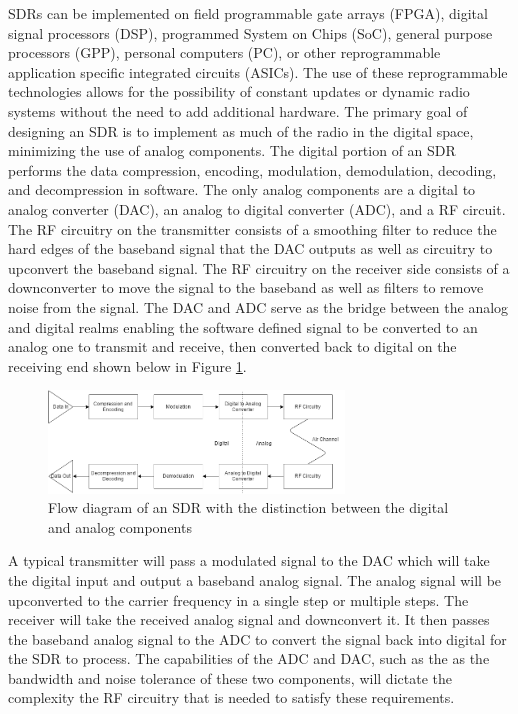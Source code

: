 SDRs can be implemented on field programmable gate arrays (FPGA), digital signal processors (DSP), programmed System on Chips (SoC), general purpose processors (GPP), personal computers (PC), or other reprogrammable application specific integrated circuits (ASICs). The use of these reprogrammable technologies allows for the possibility of constant updates or dynamic radio systems without the need to add additional hardware. The primary goal of designing an SDR is to implement as much of the radio in the digital space, minimizing the use of analog components. The digital portion of an SDR performs the data compression, encoding, modulation, demodulation, decoding, and decompression in software. The only analog components are a digital to analog converter (DAC), an analog to digital converter (ADC), and a RF circuit. The RF circuitry on the transmitter consists of a smoothing filter to reduce the hard edges of the baseband signal that the DAC outputs as well as circuitry to upconvert the baseband signal. The RF circuitry on the receiver side consists of a downconverter to move the signal to the baseband as well as filters to remove noise from the signal. The DAC and ADC serve as the bridge between the analog and digital realms enabling the software defined signal to be converted to an analog one to transmit and receive, then converted back to digital on the receiving end shown below in Figure \ref{fig:sdr_flow_diagram}.
\begin{figure}[ht]
\centering
\includegraphics[width=0.70\textwidth]{img/sdr_diagram.png}
\caption{Flow diagram of an SDR with the distinction between the digital and analog components}
\label{fig:sdr_flow_diagram}
\end{figure}\par
A typical transmitter will pass a modulated signal to the DAC which will take the digital input and output a baseband analog signal. The analog signal will be upconverted to the carrier frequency in a single step or multiple steps. The receiver will take the received analog signal and downconvert it. It then passes the baseband analog signal to the ADC to convert the signal back into digital for the SDR to process. The capabilities of the ADC and DAC, such as the as the bandwidth and noise tolerance of these two components, will dictate the complexity the RF circuitry that is needed to satisfy these requirements.\par

